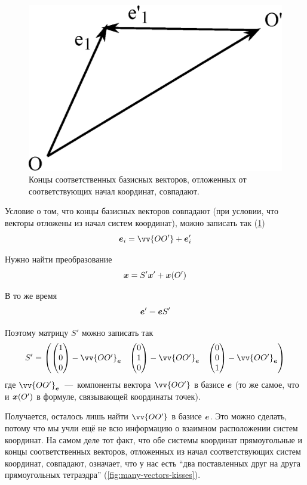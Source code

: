\documentclass[a4paper,12pt]{article}
\begin{document}
  \begin{solution}
    \begin{figure}[h]
      \centering
    
      \includegraphics[width=0.5\columnwidth]{two-vectors-kiss}
    
      \caption{Концы соответственных базисных векторов, отложенных от соответствующих начал координат, совпадают.}
      \label{fig:two-vectors-kiss}
    \end{figure}
    
    Условие о том, что концы базисных векторов совпадают (при условии, что векторы отложены из начал систем координат), можно записать так (\ref{fig:two-vectors-kiss})
    \[
      \bds e_i = \vv{OO'} + \bds e_i'
    \]
    
    Нужно найти преобразование
    \[
      \boldsymbol x = S' \boldsymbol x' + \boldsymbol x(O')
    \]
    
    В то же время
    \[
      \boldsymbol e' = \boldsymbol e S'
    \]
    
    Поэтому матрицу $S'$ можно записать так
    \[
      S' = \begin{pmatrix}
        \begin{pmatrix}1\\ 0\\ 0\end{pmatrix} - \vv{OO'}_{\bds e}
        & \begin{pmatrix}0\\ 1\\ 0\end{pmatrix} - \vv{OO'}_{\bds e}
        & \begin{pmatrix}0\\ 0\\ 1\end{pmatrix} - \vv{OO'}_{\bds e}
      \end{pmatrix}
    \]
    где $\vv{OO'}_{\bds e}$~---~компоненты вектора $\vv{OO'}$ в базисе $\boldsymbol e$ (то же самое, что и $\boldsymbol x(O')$ в формуле, связывающей координаты точек).
    
    Получается, осталось лишь найти $\vv{OO'}$ в базисе $\boldsymbol e$.
    Это можно сделать, потому что мы учли ещё не всю информацию о взаимном расположении систем координат.
    На самом деле тот факт, что обе системы координат прямоугольные и концы соответственных векторов, отложенных из начал соответствующих систем координат, совпадают, означает, что у нас есть ``два поставленных друг на друга прямоугольных тетраэдра'' (\ref{fig:many-vectors-kisses}).
    

\end{solution}
\end{document}
